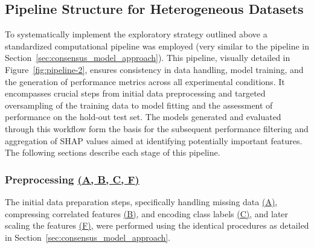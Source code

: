 \documentclass[12pt,a4paper]{report}
\begin{document}
\subsection{Pipeline Structure for Heterogeneous Datasets}
To systematically implement the exploratory strategy outlined above a standardized computational pipeline was employed (very similar to the pipeline in Section~\ref{sec:consensus_model_approach}). This pipeline, visually detailed in Figure~\ref{fig:pipeline-2}, ensures consistency in data handling, model training, and the generation of performance metrics across all experimental conditions. It encompasses crucial steps from initial data preprocessing and targeted oversampling of the training data to model fitting and the assessment of performance on the hold-out test set. The models generated and evaluated through this workflow form the basis for the subsequent performance filtering and aggregation of SHAP values aimed at identifying potentially important features. The following sections describe each stage of this pipeline.

\subsubsection{Preprocessing \hyperref[fig:pipeline-2]{(A, B, C, F)}}
\noindent The initial data preparation steps, specifically handling missing data \hyperref[fig:pipeline-2]{(A)}, compressing correlated features \hyperref[fig:pipeline-2]{(B)}, and encoding class labels \hyperref[fig:pipeline-2]{(C)}, and later scaling the features \hyperref[fig:pipeline-2]{(F)}, were performed using the identical procedures as detailed in Section~\ref{sec:consensus_model_approach}.
\end{document}
